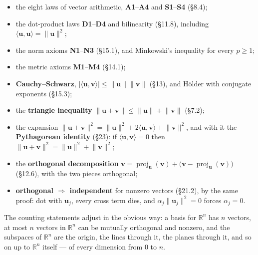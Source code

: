 \documentclass[11pt]{article}
\theoremstyle{definition}
\theoremstyle{remark}
\newcommand{\R}{\mathbb{R}}
\newcommand{\vc}[1]{\mathbf{#1}}
\newcommand{\norm}[1]{\lVert #1\rVert}
\newcommand{\proj}[2]{\operatorname{proj}_{#1}(#2)}
\begin{document}
\begin{itemize}[leftmargin=1.4em,itemsep=4pt]
  \item the eight laws of vector arithmetic, \textbf{A1}--\textbf{A4} and
        \textbf{S1}--\textbf{S4} (\S8.4);
  \item the dot-product laws \textbf{D1}--\textbf{D4} and bilinearity
        (\S11.8), including
        $\langle\vc{u},\vc{u}\rangle=\norm{\vc{u}}^{2}$;
  \item the norm axioms \textbf{N1}--\textbf{N3} (\S15.1), and Minkowski's
        inequality for every $p\ge1$;
  \item the metric axioms \textbf{M1}--\textbf{M4} (\S14.1);
  \item \textbf{Cauchy--Schwarz}, $\lvert\langle\vc{u},\vc{v}\rangle\rvert
        \le\norm{\vc{u}}\norm{\vc{v}}$ (\S13), and H\"older with conjugate
        exponents (\S15.3);
  \item the \textbf{triangle inequality}
        $\norm{\vc{u}+\vc{v}}\le\norm{\vc{u}}+\norm{\vc{v}}$ (\S7.2);
  \item the expansion
        $\norm{\vc{u}+\vc{v}}^{2}
         =\norm{\vc{u}}^{2}+2\langle\vc{u},\vc{v}\rangle+\norm{\vc{v}}^{2}$,
        and with it the \textbf{Pythagorean identity} (\S23): if
        $\langle\vc{u},\vc{v}\rangle=0$ then
        $\norm{\vc{u}+\vc{v}}^{2}=\norm{\vc{u}}^{2}+\norm{\vc{v}}^{2}$;
  \item the \textbf{orthogonal decomposition}
        $\vc{v}=\proj{\vc{u}}{\vc{v}}+\bigl(\vc{v}-\proj{\vc{u}}{\vc{v}}\bigr)$
        (\S12.6), with the two pieces orthogonal;
  \item \textbf{orthogonal $\Rightarrow$ independent} for nonzero vectors
        (\S21.2), by the same proof: dot with $\vc{u}_j$, every cross term dies,
        and $\alpha_j\norm{\vc{u}_j}^{2}=0$ forces $\alpha_j=0$.
\end{itemize}

\noindent The counting statements adjust in the obvious way: a basis for
$\R^{n}$ has $n$ vectors, at most $n$ vectors in $\R^{n}$ can be mutually
orthogonal and nonzero, and the subspaces of $\R^{n}$ are the origin, the lines
through it, the planes through it, and so on up to $\R^{n}$ itself --- of every
dimension from $0$ to $n$.

\end{document}
